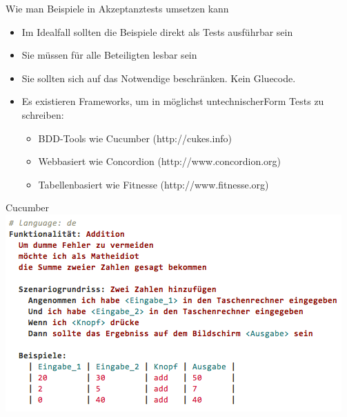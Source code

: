 \begin{frame}{Wie man Beispiele in Akzeptanztests umsetzen kann}

\begin{itemize}
	\item Im Idealfall sollten die Beispiele direkt als Tests ausführbar sein
	\item Sie müssen für alle Beteiligten lesbar sein
	\item Sie sollten sich auf das Notwendige beschränken. Kein Gluecode.
	\item Es existieren Frameworks, um in möglichst \glqq untechnischer\grqq Form Tests zu schreiben:
	\begin{itemize}
		\item BDD-Tools wie Cucumber (http://cukes.info)
		\item Webbasiert wie Concordion (http://www.concordion.org)
		\item Tabellenbasiert wie Fitnesse (http://www.fitnesse.org)
	\end{itemize}
\end{itemize}

\end{frame}


\begin{frame}{Cucumber}
\includegraphics[width=\textwidth]{Cucumber.png} \newline
\end{frame}


